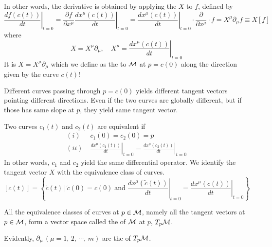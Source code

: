\documentclass[a4paper, 10pt]{article}
\begin{document}

In other words, the derivative is obtained by applying the  $X$ to $f$, defined by
\[ \left.\frac{df(c(t))}{dt}\right|_{t = 0} = \frac{\partial f}{\partial x^{\mu}}\left.\frac{dx^{\mu}(c(t))}{dt}\right|_{t = 0} = \left.\frac{dx^{\mu}(c(t))}{dt}\right|_{t = 0} \cdot \frac{\partial}{\partial x^{\mu}} \cdot f = X^{\mu}\partial_{\mu}f \equiv X[f] \]
where
\[ X = X^{\mu}\partial_{\mu}, \quad X^{\mu} = \left.\frac{dx^{\mu}(c(t))}{dt}\right|_{t = 0} \]
It is $\boxed{X = X^{\mu}\partial_{\mu}}$ which we define as the  to $\mathcal{M}$ at $p = c(0)$ along the direction given by the curve $c(t)$!

\seprule

\begin{remark}
    Different curves passing through $p = c(0)$ yields different tangent vectors pointing different directions. Even if the two curves are globally different, but if those has same slope at $p$, they yield same tangent vector.
\end{remark}

\begin{definition}
    Two curves $c_{1}(t)$ and $c_{2}(t)$ are equivalent if
    \begin{align*}
        (i) &\; c_{1}(0) = c_{2}(0) = p \\
        (ii) &\; \left.\frac{dx^{\mu}(c_{1}(t))}{dt}\right|_{t = 0} = \left.\frac{dx^{\mu}(c_{2}(t))}{dt}\right|_{t = 0}
    \end{align*}
    In other words, $c_{1}$ and $c_{2}$ yield the same differential operator. We identify the tangent vector $X$ with the equivalence class of curves.
    \[ [c(t)] = \left\{ \tilde{c}(t) \,|\, \tilde{c}(0) = c(0) \;\text{and}\; \left.\frac{dx^{\mu}(\tilde{c}(t))}{dt}\right|_{t = 0} = \left.\frac{dx^{\mu}(c(t))}{dt}\right|_{t = 0} \right\} \]
\end{definition}

\begin{definition}
    All the equivalence classes of curves at $p \in \mathcal{M}$, namely all the tangent vectors at $p \in \mathcal{M}$, form a vector space called the  of $\mathcal{M}$ at $p$, $T_{p}\mathcal{M}$.

    \vspace*{1.5em}

    Evidently, $\partial_{\mu}\,(\mu = 1,\,2,\,\cdots,\,m)$ are the  of $T_{p}\mathcal{M}$.
\end{definition}
\end{document}
